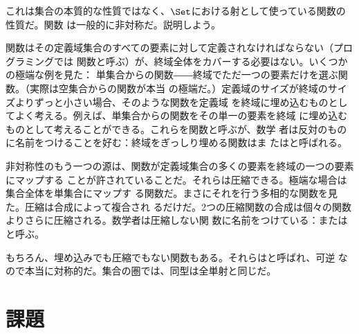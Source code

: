 これは集合の本質的な性質ではなく、$\Set$における射として使っている関数の性質だ。関数
は一般的に非対称だ。説明しよう。

関数はその定義域集合のすべての要素に対して定義されなければならない（プログラミングでは
関数と呼ぶ）が、終域全体をカバーする必要はない。いくつかの極端な例を見た：
単集合からの関数――終域でただ一つの要素だけを選ぶ関数。（実際は空集合からの関数が本当
の極端だ。）定義域のサイズが終域のサイズよりずっと小さい場合、そのような関数を定義域
を終域に埋め込むものとしてよく考える。例えば、単集合からの関数をその単一の要素を終域
に埋め込むものとして考えることができる。これらを関数と呼ぶが、数学
者は反対のものに名前をつけることを好む：終域をぎっしり埋める関数はま
たはと呼ばれる。

非対称性のもう一つの源は、関数が定義域集合の多くの要素を終域の一つの要素にマップする
ことが許されていることだ。それらは圧縮できる。極端な場合は集合全体を単集合にマップす
る関数だ。まさにそれを行う多相的な関数を見た。圧縮は合成によって複合され
るだけだ。2つの圧縮関数の合成は個々の関数よりさらに圧縮される。数学者は圧縮しない関
数に名前をつけている：またはと呼ぶ。

もちろん、埋め込みでも圧縮でもない関数もある。それらはと呼ばれ、可逆
なので本当に対称的だ。集合の圏では、同型は全単射と同じだ。

\section{課題}

